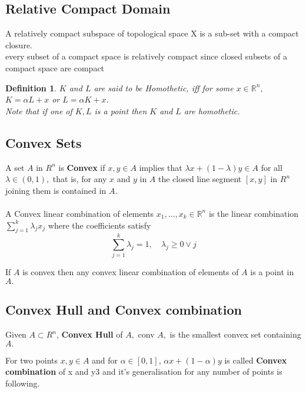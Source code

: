 \documentclass[oneside]{book}
\newtheorem{mydef}{Definition}
\begin{document}
\subsection{Relative Compact Domain} \label{ss:2}
A relatively compact  subspace of topological space X is a sub-set with a compact closure. \\
every subset of a compact space is relatively compact since closed subsets of a compact space are compact







\begin{mydef} \label{d:2}
$K$ and $L$ are said to be Homothetic, iff for some $x  \in \mathbb{R}^n,$ $K = \alpha L + x$ or $L=\alpha K+x $.\\
Note that if one of $K, L $ is a point then $K $ and $L$ are homothetic.
\end{mydef}






\subsection{Convex Sets}
    \label{ss:3}
 A set $A$ in $R^{n}$ is \textbf{Convex} if $x, y \in A$ implies that $\lambda x+(1-\lambda) y \in A$
for all $\lambda \in(0,1),$ that is, for any $x$ and $y$ in $A$ the closed line segment $[x, y]$ in
$R^{n}$ joining them is contained in $A .$\\~\\

 A Convex linear combination of elements $x_{1}, \ldots, x_{k} \in \mathbb{R}^{n}$ is the
linear combination
$
\sum_{j=1}^{k} \lambda_{j} x_{j}
$
where the coefficients satisfy
$$
\sum_{j=1}^{k} \lambda_{j}=1, \quad \lambda_{j} \geq 0 \vee j
$$


If $A$ is convex then any convex linear combination of elements
of $A$ is a point in $A .$\\

 
 \subsection{Convex Hull and Convex combination} \label{ss:4}
 Given $A \subset R^{n}$, \textbf{Convex Hull} of $A,$ conv $A,$ is the smallest
convex set containing $A .$

 For two points $x,y \in A$ and for $\alpha \in [0,1]$, $\alpha x +(1- \alpha)y  $ is called \textbf{Convex combination} of x and y3 and it's 
 generalisation for any number of  points is following. \\
\end{document}
